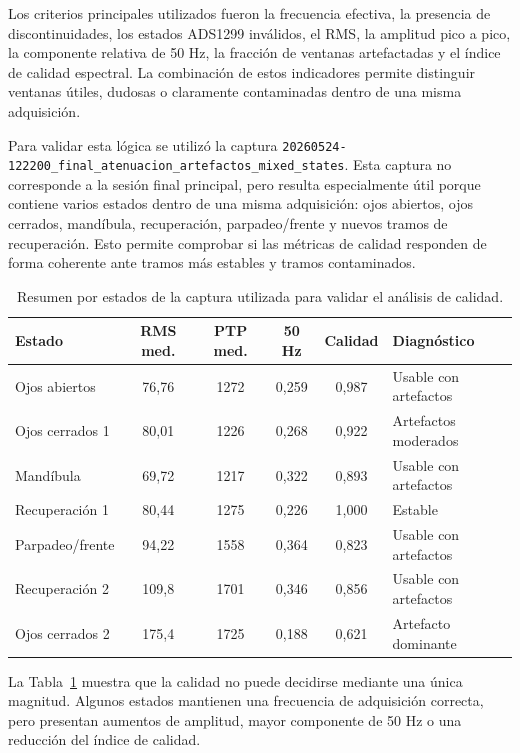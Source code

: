 \documentclass[../main.tex]{subfiles}
\begin{document}
Los criterios principales utilizados fueron la frecuencia efectiva, la presencia de discontinuidades, los estados ADS1299 inválidos, el RMS, la amplitud pico a pico, la componente relativa de 50 Hz, la fracción de ventanas artefactadas y el índice de calidad espectral. La combinación de estos indicadores permite distinguir ventanas útiles, dudosas o claramente contaminadas dentro de una misma adquisición.

Para validar esta lógica se utilizó la captura \texttt{20260524-122200\_final\_atenuacion\_artefactos\_mixed\_states}. Esta captura no corresponde a la sesión final principal, pero resulta especialmente útil porque contiene varios estados dentro de una misma adquisición: ojos abiertos, ojos cerrados, mandíbula, recuperación, parpadeo/frente y nuevos tramos de recuperación. Esto permite comprobar si las métricas de calidad responden de forma coherente ante tramos más estables y tramos contaminados.

\begin{table}[htbp]
    \centering
    \small
    \caption{Resumen por estados de la captura utilizada para validar el análisis de calidad.}
    \label{tab:validacion_calidad_estados}
    \begin{tabular}{p{} c c c c p{}}
        \hline
        \textbf{Estado} & \textbf{RMS med.} & \textbf{PTP med.} & \textbf{50 Hz} & \textbf{Calidad} & \textbf{Diagnóstico} \\
        \hline
        Ojos abiertos & 76,76 & 1272 & 0,259 & 0,987 & Usable con artefactos  \\
        Ojos cerrados 1 & 80,01 & 1226 & 0,268 & 0,922 & Artefactos moderados \\
        Mandíbula & 69,72 & 1217 & 0,322 & 0,893 & Usable con artefactos  \\
        Recuperación 1 & 80,44 & 1275 & 0,226 & 1,000 & Estable \\
        Parpadeo/frente & 94,22 & 1558 & 0,364 & 0,823 & Usable con artefactos  \\
        Recuperación 2 & 109,8 & 1701 & 0,346 & 0,856 & Usable con artefactos  \\
        Ojos cerrados 2 & 175,4 & 1725 & 0,188 & 0,621 & Artefacto dominante \\
        \hline
    \end{tabular}
\end{table}

La Tabla~\ref{tab:validacion_calidad_estados} muestra que la calidad no puede decidirse mediante una única magnitud. Algunos estados mantienen una frecuencia de adquisición correcta, pero presentan aumentos de amplitud, mayor componente de 50 Hz o una reducción del índice de calidad.
\end{document}
